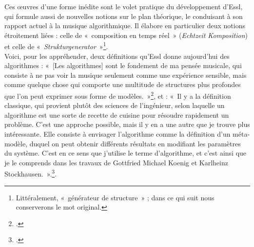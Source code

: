 \documentclass[a4paper,12pt]{article}
\newcommand{\guill}[1]{«~#1~»}
\begin{document}
Ces œuvres d'une forme inédite sont le volet pratique du développement d'Essl, qui formule aussi de nouvelles notions sur le plan théorique, le conduisant à son rapport actuel à la musique algorithmique. Il élabore en particulier deux notions étroitement liées : celle de \guill{composition en temps réel} (\emph{Echtzeit Komposition}) et celle de \guill{\emph{Strukturgenerator}}\footnote{Littéralement, \guill{générateur de structure} ; dans ce qui suit nous conserverons le mot original.}. \\
Voici, pour les appréhender, deux définitions qu'Essl donne aujourd'hui des algorithmes : \guill{[Les algorithmes] sont le fondement de ma pensée musicale, qui consiste à ne pas voir la musique seulement comme une expérience sensible, mais comme quelque chose qui comporte une multitude de structures plus profondes que l'on peut exprimer sous forme de modèles.}\footnote{\cite{omniainomnibus}.}, et : \guill{Il y a la définition classique, qui provient plutôt des sciences de l'ingénieur, selon laquelle un algorithme est une sorte de recette de cuisine pour résoudre rapidement un problème. C'est une approche possible, mais il y en a une autre que je trouve plus intéressante. Elle consiste à envisager l'algorithme comme la définition d'un méta-modèle, duquel on peut obtenir différents résultats en modifiant les paramètres du système. C'est en ce sens que j'utilise le terme d'algorithme, et c'est ainsi que je le comprends dans les travaux de Gottfried Michael Koenig et Karlheinz Stockhausen.}.\footnote{\cite{intuitionautomation}.}. \\
\end{document}
